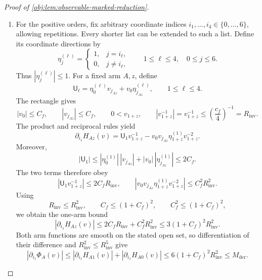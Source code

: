 \documentclass[11pt]{article}
\begin{document}
\begin{proof}[Proof of \cref{obj:lem:observable-marked-reduction}]
\begin{enumerate}
\item For the positive orders, fix arbitrary coordinate indices
\(i_1,\ldots,i_4\in\{0,\ldots,6\}\), allowing repetitions. Every shorter list can be extended to such a list. Define its coordinate directions by
\[
\eta^{(\ell)}_j=
\begin{cases}
1,&j=i_\ell,\\
0,&j\ne i_\ell,
\end{cases}
\qquad 1\le\ell\le4,\quad 0\le j\le6.
\]
Thus \(|\eta^{(\ell)}_j|\le1\). For a fixed arm \(A,z\), define
\[
\mathsf U_\ell
=\eta^{(\ell)}_0v_{j_{Az}}
 +v_0\eta^{(\ell)}_{j_{Az}},
\qquad 1\le\ell\le4.
\]
The rectangle gives
\[
|v_0|\le C_f,\qquad |v_{j_{Az}}|\le C_f,\qquad
0<v_{1+z},\qquad
|v_{1+z}^{-1}|
=v_{1+z}^{-1}
\le\left(\frac{c_f}{4}\right)^{-1}
=R_{\mathrm{inv}}.
\]
The product and reciprocal rules yield
\[
\partial_{i_1}H_{Az}(v)
=\mathsf U_1v_{1+z}^{-1}
-v_0v_{j_{Az}}\eta^{(1)}_{1+z}v_{1+z}^{-2}.
\]
Moreover,
\[
|\mathsf U_1|
\le|\eta^{(1)}_0|\,|v_{j_{Az}}|
   +|v_0|\,|\eta^{(1)}_{j_{Az}}|
\le2C_f.
\]
The two terms therefore obey
\[
|\mathsf U_1v_{1+z}^{-1}|\le2C_fR_{\mathrm{inv}},
\qquad
|v_0v_{j_{Az}}\eta^{(1)}_{1+z}v_{1+z}^{-2}|
\le C_f^2R_{\mathrm{inv}}^2.
\]
Using
\[
R_{\mathrm{inv}}\le R_{\mathrm{inv}}^2,\qquad
C_f\le(1+C_f)^2,\qquad
C_f^2\le(1+C_f)^2,
\]
we obtain the one-arm bound
\[
|\partial_{i_1}H_{Az}(v)|
\le2C_fR_{\mathrm{inv}}+C_f^2R_{\mathrm{inv}}^2
\le3(1+C_f)^2R_{\mathrm{inv}}^2.
\]
Both arm functions are smooth on the stated open set, so differentiation of their difference and \(R_{\mathrm{inv}}^2\le R_{\mathrm{inv}}^5\) give
\[
|\partial_{i_1}\Phi_A(v)|
\le|\partial_{i_1}H_{A1}(v)|
  +|\partial_{i_1}H_{A0}(v)|
\le6(1+C_f)^2R_{\mathrm{inv}}^2
\le M_{\mathrm{der}}.
\]


\end{enumerate}
\end{proof}
\end{document}
